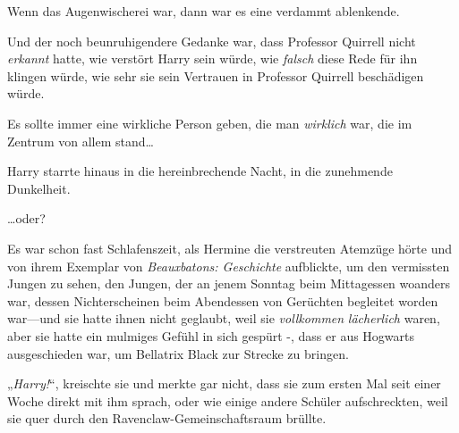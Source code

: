 Wenn das Augenwischerei war, dann war es eine verdammt ablenkende.

Und der noch beunruhigendere Gedanke war, dass Professor Quirrell nicht \emph{erkannt} hatte, wie verstört Harry sein würde, wie \emph{falsch} diese Rede für ihn klingen würde, wie sehr sie sein Vertrauen in Professor Quirrell beschädigen würde.

Es sollte immer eine wirkliche Person geben, die man \emph{wirklich} war, die im Zentrum von allem stand…

Harry starrte hinaus in die hereinbrechende Nacht, in die zunehmende Dunkelheit.

…oder?

\later

Es war schon fast Schlafenszeit, als Hermine die verstreuten Atemzüge hörte und von ihrem Exemplar von \emph{Beauxbatons: Geschichte} aufblickte, um den vermissten Jungen zu sehen, den Jungen, der an jenem Sonntag beim Mittagessen woanders war, dessen Nichterscheinen beim Abendessen von Gerüchten begleitet worden war—und sie hatte ihnen nicht geglaubt, weil sie \emph{vollkommen} \emph{lächerlich} waren, aber sie hatte ein mulmiges Gefühl in sich gespürt -, dass er aus Hogwarts ausgeschieden war, um Bellatrix Black zur Strecke zu bringen.

„\emph{Harry!}“, kreischte sie und merkte gar nicht, dass sie zum ersten Mal seit einer Woche direkt mit ihm sprach, oder wie einige andere Schüler aufschreckten, weil sie quer durch den Ravenclaw-Gemeinschaftsraum brüllte.

